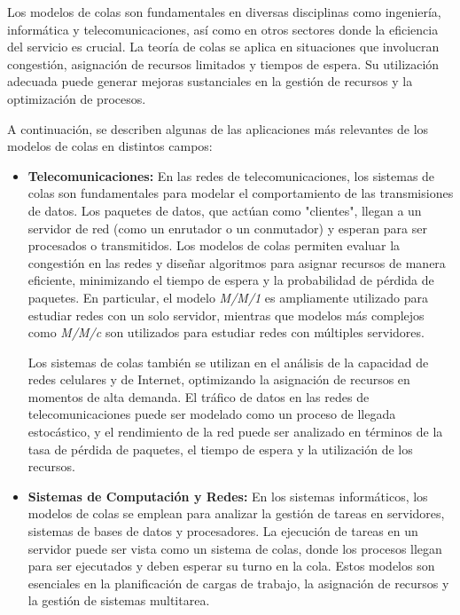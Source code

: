 \documentclass{article}
\begin{document}
Los modelos de colas son fundamentales en diversas disciplinas como ingeniería, informática y telecomunicaciones, así como en otros sectores donde la eficiencia del servicio es crucial. La teoría de colas se aplica en situaciones que involucran congestión, asignación de recursos limitados y tiempos de espera. Su utilización adecuada puede generar mejoras sustanciales en la gestión de recursos y la optimización de procesos.

A continuación, se describen algunas de las aplicaciones más relevantes de los modelos de colas en distintos campos:

\begin{itemize}
    \item \textbf{Telecomunicaciones:}
    En las redes de telecomunicaciones, los sistemas de colas son fundamentales para modelar el comportamiento de las transmisiones de datos. Los paquetes de datos, que actúan como "clientes", llegan a un servidor de red (como un enrutador o un conmutador) y esperan para ser procesados o transmitidos. Los modelos de colas permiten evaluar la congestión en las redes y diseñar algoritmos para asignar recursos de manera eficiente, minimizando el tiempo de espera y la probabilidad de pérdida de paquetes. En particular, el modelo \textit{M/M/1} es ampliamente utilizado para estudiar redes con un solo servidor, mientras que modelos más complejos como \textit{M/M/c} son utilizados para estudiar redes con múltiples servidores.
    
    Los sistemas de colas también se utilizan en el análisis de la capacidad de redes celulares y de Internet, optimizando la asignación de recursos en momentos de alta demanda. El tráfico de datos en las redes de telecomunicaciones puede ser modelado como un proceso de llegada estocástico, y el rendimiento de la red puede ser analizado en términos de la tasa de pérdida de paquetes, el tiempo de espera y la utilización de los recursos.

    \item \textbf{Sistemas de Computación y Redes:}
    En los sistemas informáticos, los modelos de colas se emplean para analizar la gestión de tareas en servidores, sistemas de bases de datos y procesadores. La ejecución de tareas en un servidor puede ser vista como un sistema de colas, donde los procesos llegan para ser ejecutados y deben esperar su turno en la cola. Estos modelos son esenciales en la planificación de cargas de trabajo, la asignación de recursos y la gestión de sistemas multitarea.


\end{itemize}
\end{document}
